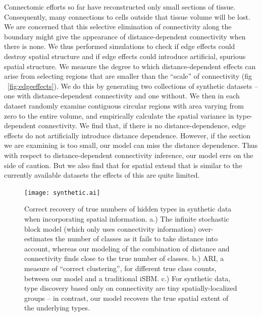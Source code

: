 \documentclass{article}
\begin{document}
Connectomic efforts so far have reconstructed only small sections of
tissue. Consequently, many connections to cells outside that tissue
volume will be lost. We are concerned that this selective elimination
of connectivity along the boundary might give the appearance of
distance-dependent connectivity when there is none. We thus performed
simulations to check if edge effects could destroy spatial structure
and if edge effects could introduce artificial, spurious spatial
structure. We measure the degree to which distance-dependent effects
can arise from selecting regions that are smaller than the ``scale''
of connectivity (fig ~\ref{fig:edgeeffects}). We do this by generating
two collections of synthetic datasets -- one with distance-dependent
connectivity and one without.  We then in each dataset randomly
examine contiguous circular regions with area varying from zero to the
entire volume, and empirically calculate the spatial variance in
type-dependent connectivity.  We find that, if there is no
distance-dependence, edge effects do not artificially introduce
distance dependence. However, if the section we are examining is too
small, our model can miss the distance dependence. Thus with respect
to distance-dependent connectivity inference, our model errs on the
side of caution. But we also find that for spatial extend that is
similar to the currently available datasets the effects of this are
quite limited.



\begin{figure}
  \centering 
  \centerline{\texttt{[image: synthetic.ai]}}
  \caption{Correct recovery of true numbers of hidden types in
    synthetic data when incorporating spatial information. a.) The
    infinite stochastic block model (which only uses connectivity
    information) over-estimates the number of classes as it fails to
    take distance into account, whereas our modeling of the
    combination of distance and connectivity finds close to the true
    number of classes. b.) ARI, a measure of ``correct clustering'',
    for different true class counts, between our model and a
    traditional iSBM. c.) For synthetic data, type discovery based
    only on connectivity are tiny spatially-localized groups -- in
    contrast, our model recovers the true spatial extent of the
    underlying types.  }
\label{fig:synthetic}
\end{figure}
\end{document}
